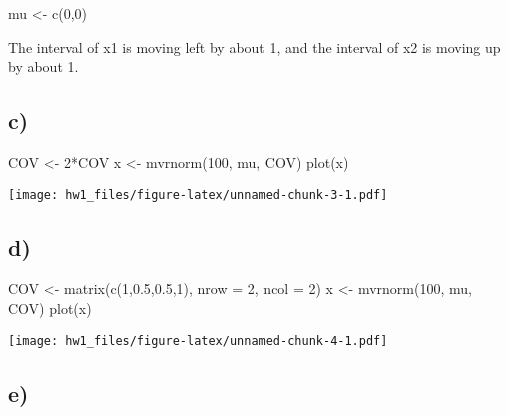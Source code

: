 \documentclass[
]{article}
\newenvironment{Shaded}{\begin{snugshade}}{\end{snugshade}}
\newcommand{\AttributeTok}[1]{\textcolor[rgb]{0.77,0.63,0.00}{#1}}
\newcommand{\DecValTok}[1]{\textcolor[rgb]{0.00,0.00,0.81}{#1}}
\newcommand{\FloatTok}[1]{\textcolor[rgb]{0.00,0.00,0.81}{#1}}
\newcommand{\FunctionTok}[1]{\textcolor[rgb]{0.00,0.00,0.00}{#1}}
\newcommand{\NormalTok}[1]{#1}
\newcommand{\OtherTok}[1]{\textcolor[rgb]{0.56,0.35,0.01}{#1}}
\newcommand{\SpecialCharTok}[1]{\textcolor[rgb]{0.00,0.00,0.00}{#1}}
\begin{document}
\begin{Shaded}
\begin{Highlighting}[]
\NormalTok{mu }\OtherTok{\textless{}{-}} \FunctionTok{c}\NormalTok{(}\DecValTok{0}\NormalTok{,}\DecValTok{0}\NormalTok{)}
\end{Highlighting}
\end{Shaded}

The interval of x1 is moving left by about 1, and the interval of x2 is
moving up by about 1.

\hypertarget{c}{%
\subsection{c)}\label{c}}

\begin{Shaded}
\begin{Highlighting}[]
\NormalTok{COV }\OtherTok{\textless{}{-}} \DecValTok{2}\SpecialCharTok{*}\NormalTok{COV}
\NormalTok{x }\OtherTok{\textless{}{-}} \FunctionTok{mvrnorm}\NormalTok{(}\DecValTok{100}\NormalTok{, mu, COV)}
\FunctionTok{plot}\NormalTok{(x)}
\end{Highlighting}
\end{Shaded}

\texttt{[image: hw1\_files/figure-latex/unnamed-chunk-3-1.pdf]}

\hypertarget{d}{%
\subsection{d)}\label{d}}

\begin{Shaded}
\begin{Highlighting}[]
\NormalTok{COV }\OtherTok{\textless{}{-}} \FunctionTok{matrix}\NormalTok{(}\FunctionTok{c}\NormalTok{(}\DecValTok{1}\NormalTok{,}\FloatTok{0.5}\NormalTok{,}\FloatTok{0.5}\NormalTok{,}\DecValTok{1}\NormalTok{), }\AttributeTok{nrow =} \DecValTok{2}\NormalTok{, }\AttributeTok{ncol =} \DecValTok{2}\NormalTok{)}
\NormalTok{x }\OtherTok{\textless{}{-}} \FunctionTok{mvrnorm}\NormalTok{(}\DecValTok{100}\NormalTok{, mu, COV)}
\FunctionTok{plot}\NormalTok{(x)}
\end{Highlighting}
\end{Shaded}

\texttt{[image: hw1\_files/figure-latex/unnamed-chunk-4-1.pdf]}

\hypertarget{e}{%
\subsection{e)}\label{e}}
\end{document}
